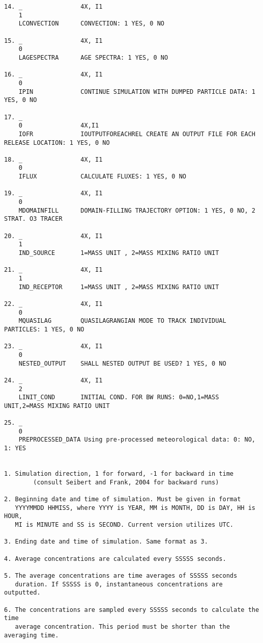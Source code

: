 \documentclass{egu}                  %
\begin{document}
\begin{scriptsize}
\begin{verbatim}
14. _                4X, I1
    1
    LCONVECTION      CONVECTION: 1 YES, 0 NO

15. _                4X, I1
    0
    LAGESPECTRA      AGE SPECTRA: 1 YES, 0 NO

16. _                4X, I1
    0
    IPIN             CONTINUE SIMULATION WITH DUMPED PARTICLE DATA: 1 YES, 0 NO

17. _
    0                4X,I1
    IOFR             IOUTPUTFOREACHREL CREATE AN OUTPUT FILE FOR EACH RELEASE LOCATION: 1 YES, 0 NO

18. _                4X, I1
    0
    IFLUX            CALCULATE FLUXES: 1 YES, 0 NO

19. _                4X, I1
    0
    MDOMAINFILL      DOMAIN-FILLING TRAJECTORY OPTION: 1 YES, 0 NO, 2 STRAT. O3 TRACER

20. _                4X, I1
    1
    IND_SOURCE       1=MASS UNIT , 2=MASS MIXING RATIO UNIT

21. _                4X, I1
    1
    IND_RECEPTOR     1=MASS UNIT , 2=MASS MIXING RATIO UNIT

22. _                4X, I1
    0
    MQUASILAG        QUASILAGRANGIAN MODE TO TRACK INDIVIDUAL PARTICLES: 1 YES, 0 NO

23. _                4X, I1
    0
    NESTED_OUTPUT    SHALL NESTED OUTPUT BE USED? 1 YES, 0 NO

24. _                4X, I1
    2
    LINIT_COND       INITIAL COND. FOR BW RUNS: 0=NO,1=MASS UNIT,2=MASS MIXING RATIO UNIT
    
25. _ 
    0
    PREPROCESSED_DATA Using pre-processed meteorological data: 0: NO, 1: YES
    
    
1. Simulation direction, 1 for forward, -1 for backward in time
        (consult Seibert and Frank, 2004 for backward runs)

2. Beginning date and time of simulation. Must be given in format
   YYYYMMDD HHMISS, where YYYY is YEAR, MM is MONTH, DD is DAY, HH is HOUR,
   MI is MINUTE and SS is SECOND. Current version utilizes UTC.

3. Ending date and time of simulation. Same format as 3.

4. Average concentrations are calculated every SSSSS seconds.

5. The average concentrations are time averages of SSSSS seconds
   duration. If SSSSS is 0, instantaneous concentrations are outputted.

6. The concentrations are sampled every SSSSS seconds to calculate the time
   average concentration. This period must be shorter than the averaging time.


\end{verbatim}
\end{scriptsize}
\end{document}
